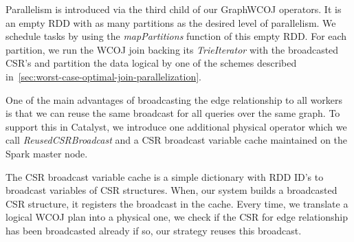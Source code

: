 Parallelism is introduced via the third child of our GraphWCOJ operators.
It is an empty RDD with as many partitions as the desired level of parallelism.
We schedule tasks by using the \textit{mapPartitions} function of this empty RDD.
For each partition, we run the \textsc{WCOJ} join backing its \textit{TrieIterator} with the broadcasted CSR's and partition the data
logical by one of the schemes described in~\cref{sec:worst-case-optimal-join-parallelization}.

One of the main advantages of broadcasting the edge relationship to all workers is that we can reuse the same broadcast for all queries
over the same graph.
To support this in Catalyst, we introduce one additional physical operator which we call \textit{ReusedCSRBroadcast} and a CSR broadcast
variable cache maintained on the Spark master node.

The CSR broadcast variable cache is a simple dictionary with RDD ID's to broadcast variables of CSR structures.
When, our system builds a broadcasted CSR structure, it registers the broadcast in the cache.
Every time, we translate a logical WCOJ plan into a physical one, we check if the CSR for edge relationship has been broadcasted already
if so, our strategy reuses this broadcast.



